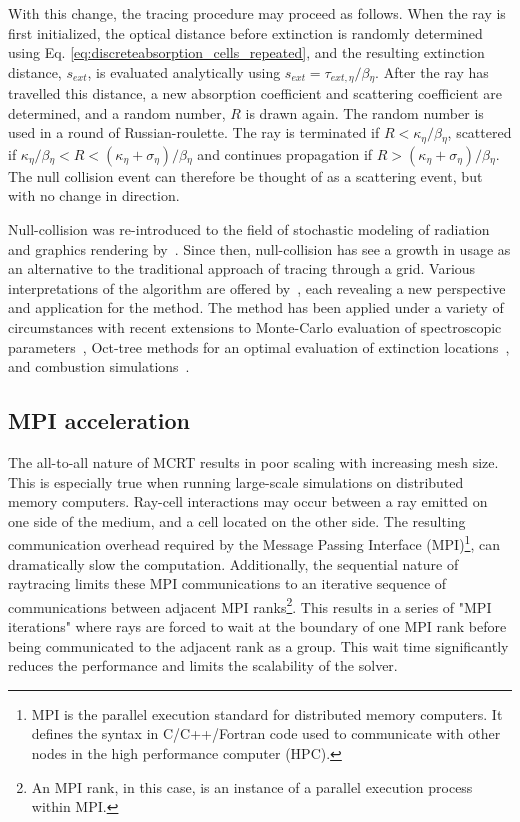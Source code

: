 With this change, the tracing procedure may proceed as follows. When the ray is first initialized, the optical distance before extinction is randomly determined using Eq. \ref{eq:discreteabsorption_cells_repeated}, and the resulting extinction distance, $s_{ext}$, is evaluated analytically using $s_{ext}=\tau{}_{ext,\eta}/\beta{}_\eta{}$.
After the ray has travelled this distance, a new absorption coefficient and scattering coefficient are determined, and a random number, $R$ is drawn again.
The random number is used in a round of Russian-roulette.
The ray is terminated if $R<\kappa{}_\eta{}/\beta{}_\eta{}$, scattered if $\kappa{}_\eta{}/\beta{}_\eta{}<R<(\kappa{}_\eta{}+\sigma{}_\eta{})/\beta{}_\eta{}$ and continues propagation if $R>(\kappa{}_\eta{}+\sigma{}_\eta{})/\beta{}_\eta{}$. 
The null collision event can therefore be thought of as a scattering event, but with no change in direction.

Null-collision was re-introduced to the field of stochastic modeling of radiation and graphics rendering by~\citet{Galtier2013IntegralAlgorithms}. Since then, null-collision has see a growth in usage as an alternative to the traditional approach of tracing through a grid. 
Various interpretations of the algorithm are offered by~\citet{ElHafi2021ThreeAlgorithms}, each revealing a new perspective and application for the method.
The method has been applied under a variety of circumstances with recent extensions to Monte-Carlo evaluation of spectroscopic parameters~\cite{Galtier2015RadiativeApproach}, Oct-tree methods for an optimal evaluation of extinction locations~\cite{Villefranque2019AAtmospheres}, and combustion simulations~\cite{Eymet2013Null-collisionSimulators}.


\subsection{MPI acceleration}\label{section:MPIacceleration}
The all-to-all nature of MCRT results in poor scaling with increasing mesh size. 
This is especially true when running large-scale simulations on distributed memory computers.
Ray-cell interactions may occur between a ray emitted on one side of the medium, and a cell located on the other side.
The resulting communication overhead required by the Message Passing Interface (MPI)\footnote{MPI is the parallel execution standard for distributed memory computers. It defines the syntax in C/C++/Fortran code used to communicate with other nodes in the high performance computer (HPC).}, can dramatically slow the computation. Additionally, the sequential nature of raytracing limits these MPI communications to an iterative sequence of communications between adjacent MPI ranks\footnote{An MPI rank, in this case, is an instance of a parallel execution process within MPI.}.
This results in a series of "MPI iterations" where rays are forced to wait at the boundary of one MPI rank before being communicated to the adjacent rank as a group. This wait time significantly reduces the performance and limits the scalability of the solver.

